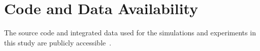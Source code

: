 \section*{Code and Data Availability}

The source code and integrated data used for the simulations and experiments in this study are publicly accessible~\cite{SFWMSC2026}.